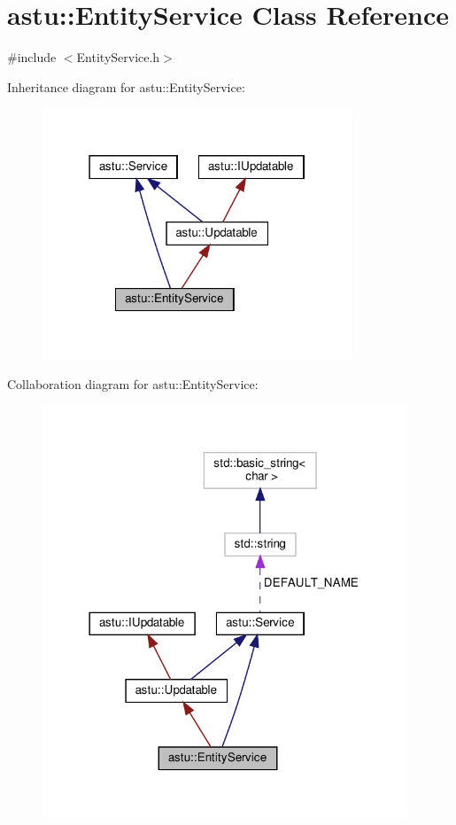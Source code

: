 \hypertarget{classastu_1_1EntityService}{}\section{astu\+:\+:Entity\+Service Class Reference}
\label{classastu_1_1EntityService}


{\ttfamily \#include $<$Entity\+Service.\+h$>$}



Inheritance diagram for astu\+:\+:Entity\+Service\+:\nopagebreak
\begin{figure}[H]
\begin{center}
\leavevmode
\includegraphics[width=262pt]{classastu_1_1EntityService__inherit__graph}
\end{center}
\end{figure}


Collaboration diagram for astu\+:\+:Entity\+Service\+:\nopagebreak
\begin{figure}[H]
\begin{center}
\leavevmode
\includegraphics[width=309pt]{classastu_1_1EntityService__coll__graph}
\end{center}
\end{figure}
